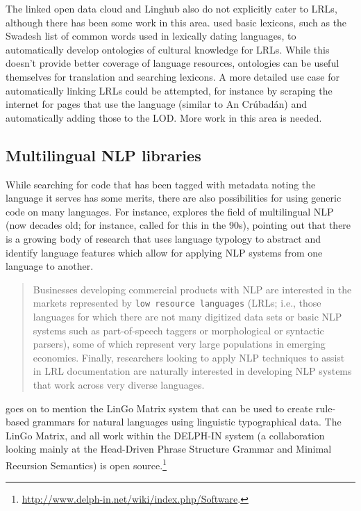 The linked open data cloud and Linghub also do not explicitly cater to LRLs, although there has been some work in this area. \citet{huang2017linking} used basic lexicons, such as the Swadesh list \citep{swadesh1955towards} of common words used in lexically dating languages, to automatically develop ontologies of cultural knowledge for LRLs. While this doesn't provide better coverage of language resources, ontologies can be useful themselves for translation and searching lexicons. A more detailed use case for automatically linking LRLs could be attempted, for instance by scraping the internet for pages that use the language (similar to An Cr\'{u}bad\'{a}n) and automatically adding those to the LOD. More work in this area is needed.

\subsection{Multilingual NLP libraries}
\label{subsec:popular-open-source-libraries}

While searching for code that has been tagged with metadata noting the language it serves has some merits, there are also possibilities for using generic code on many languages. For instance, \citet{bender2016linguistic} explores the field of multilingual NLP (now decades old; for instance, \citet{kay1997proper} called for this in the 90s), pointing out that there is a growing body of research that uses language typology to abstract and identify language features which allow for applying NLP systems from one language to another.

\begin{quote}
Businesses developing commercial products with NLP are interested in the markets represented by {\tt low resource languages} (LRLs; i.e., those languages for which there are not many digitized data sets or basic NLP systems such as part-of-speech taggers or morphological or syntactic parsers), some of which represent very large populations in emerging economies. Finally, researchers looking to apply NLP techniques to assist in LRL documentation are naturally interested in developing NLP systems that work across very diverse languages.\citep[646]{bender2016linguistic}
\end{quote}

\citet{bender2016linguistic} goes on to mention the LinGo Matrix system \citep{bender2002grammar, drellishak2005coordination} that can be used to create rule-based grammars for natural languages using linguistic typographical data. The LinGo Matrix, and all work within the DELPH-IN system (a collaboration looking mainly at the Head-Driven Phrase Structure Grammar and Minimal Recursion Semantics) is open source.\footnote{\href{http://www.delph-in.net/wiki/index.php/Software}{http://www.delph-in.net/wiki/index.php/Software}. }

